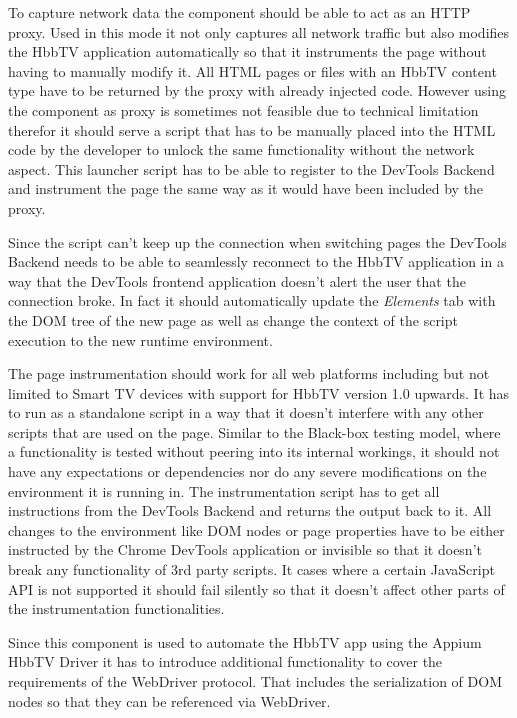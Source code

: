 To capture network data the component should be able to act as an HTTP proxy. Used in this mode it not only captures all network traffic but also modifies the HbbTV application automatically so that it instruments the page without having to manually modify it. All HTML pages or files with an HbbTV content type have to be returned by the proxy with already injected code. However using the component as proxy is sometimes not feasible due to technical limitation therefor it should serve a script that has to be manually placed into the HTML code by the developer to unlock the same functionality without the network aspect. This launcher script has to be able to register to the DevTools Backend and instrument the page the same way as it would have been included by the proxy.

Since the script can't keep up the connection when switching pages the DevTools Backend needs to be able to seamlessly reconnect to the HbbTV application in a way that the DevTools frontend application doesn't alert the user that the connection broke. In fact it should automatically update the \textit{Elements} tab with the DOM tree of the new page as well as change the context of the script execution to the new runtime environment.

The page instrumentation should work for all web platforms including but not limited to Smart TV devices with support for HbbTV version 1.0 upwards. It has to run as a standalone script in a way that it doesn't interfere with any other scripts that are used on the page. Similar to the Black-box testing model, where a functionality is tested without peering into its internal workings, it should not have any expectations or dependencies nor do any severe modifications on the environment it is running in. The instrumentation script has to get all instructions from the DevTools Backend and returns the output back to it. All changes to the environment like DOM nodes or page properties have to be either instructed by the Chrome DevTools application or invisible so that it doesn't break any functionality of 3rd party scripts. It cases where a certain JavaScript API is not supported it should fail silently so that it doesn't affect other parts of the instrumentation functionalities.

Since this component is used to automate the HbbTV app using the Appium HbbTV Driver it has to introduce additional functionality to cover the requirements of the WebDriver protocol. That includes the serialization of DOM nodes so that they can be referenced via WebDriver.

